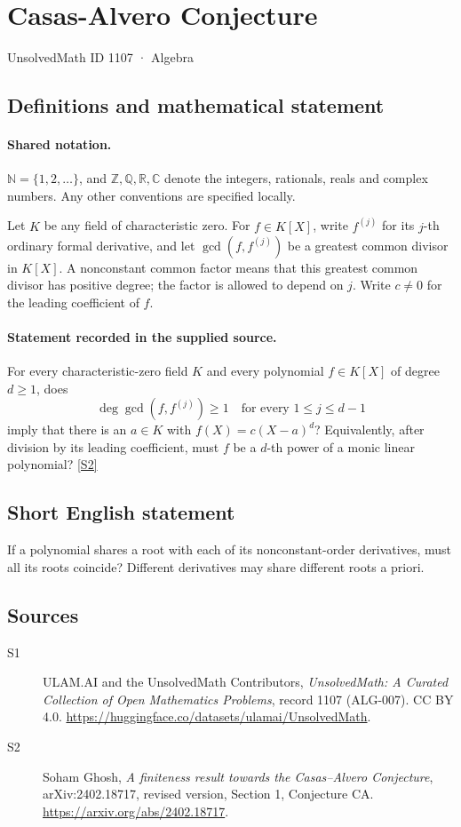 \documentclass[11pt]{article}
\newcommand{\sref}[2]{\hyperlink{source:#1:#2}{[S#2]}}
\begin{document}
\setcounter{section}{1106}
\section{Casas-Alvero Conjecture}\label{1107}
{\small\sffamily UnsolvedMath ID 1107 · Algebra}
\subsection{Definitions and mathematical statement}

\paragraph{Shared notation.}$\mathbb N=\{1,2,\ldots\}$, and $\mathbb Z,\mathbb Q,\mathbb R,\mathbb C$ denote the integers, rationals, reals and complex numbers. Any other conventions are specified locally.


Let \(K\) be any field of characteristic zero.  For \(f\in K[X]\), write
\(f^{(j)}\) for its \(j\)-th ordinary formal derivative, and let
\(\gcd(f,f^{(j)})\) be a greatest common divisor in \(K[X]\).
A nonconstant common factor means that this greatest common divisor has
positive degree; the factor is allowed to depend on \(j\).
Write \(c\ne0\) for the leading coefficient of \(f\).
\paragraph{Statement recorded in the supplied source.}
For every characteristic-zero field \(K\) and every polynomial
\(f\in K[X]\) of degree \(d\ge1\), does
\[
 \deg\gcd(f,f^{(j)})\ge1\quad\text{for every }1\le j\le d-1
\]
imply that there is an \(a\in K\) with \(f(X)=c(X-a)^d\)?
Equivalently, after division by its leading coefficient, must \(f\)
be a \(d\)-th power of a monic linear polynomial? \sref{1107}{2}
\subsection{Short English statement}
If a polynomial shares a root with each of its nonconstant-order derivatives, must all its roots coincide? Different derivatives may share different roots a priori.
\subsection{Sources}
\begin{description}
\item[\hypertarget{source:1107:1}{S1}] ULAM.AI and the UnsolvedMath Contributors, \emph{UnsolvedMath: A Curated Collection of Open Mathematics Problems}, record 1107 (ALG-007). CC BY 4.0. \url{https://huggingface.co/datasets/ulamai/UnsolvedMath}.
\item[\hypertarget{source:1107:2}{S2}] Soham Ghosh, \emph{A finiteness result towards the Casas--Alvero Conjecture}, arXiv:2402.18717, revised version, Section 1, Conjecture CA. \url{https://arxiv.org/abs/2402.18717}.
\end{description}
\label{end:1107}
\end{document}
